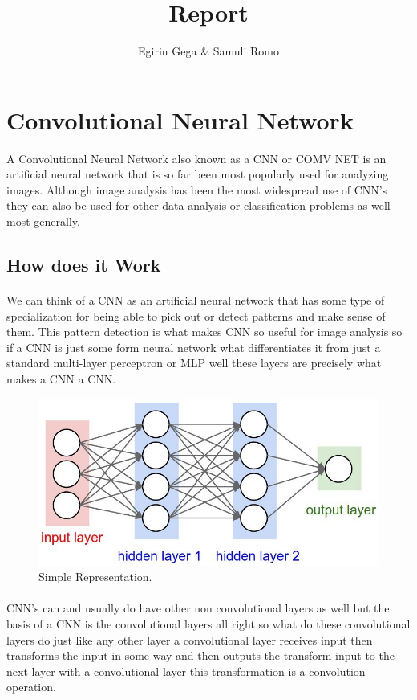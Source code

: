 \documentclass{article}
\title{Report}
\author{Egirin Gega \&  Samuli Romo}
\begin{document}
  \maketitle

  \newpage
  \tableofcontents
  \newpage
  \listoffigures
  \newpage
  \listoftables

  \newpage
  \section{Convolutional Neural Network}
  A Convolutional Neural Network also known as a CNN or COMV NET is an artificial neural network that is so far been most popularly used for analyzing images. Although image analysis has been the most widespread use of CNN's they can also be used for other data analysis or classification problems as well most generally.
  \subsection{How does it Work}
    \paragraph{}
    We can think of a CNN as an artificial neural network that has some type of specialization for being able to pick out or detect patterns and make sense of them. This pattern detection is what makes CNN so useful for image analysis so if a CNN is just some form  neural network what differentiates it from just a standard multi-layer perceptron or MLP well  these layers are precisely what makes a CNN a CNN.
    \begin{figure}[h!]
      \begin{center}
        \includegraphics[width=0.7\linewidth]{img/Visualization-of-a-traditional-fully-connected-neural-network-Stanford-University.png}
        \caption{Simple Representation.}
        \label{fig:snn}
      \end{center}
    \end{figure}
    \paragraph{}
    CNN's can and usually do have other non convolutional layers as well but the basis of a CNN is the convolutional layers all right so what do these convolutional layers do just like any other layer a convolutional layer receives input then transforms the input in some way and then outputs the transform input to the next layer with a convolutional layer this transformation is a convolution operation.
\end{document}
